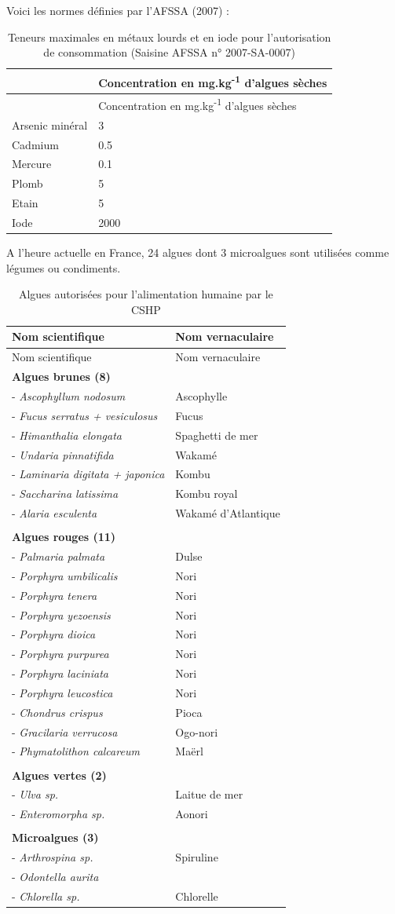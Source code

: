 \documentclass[
]{book}
\begin{document}
Voici les normes définies par l'AFSSA (2007) :

\begin{longtable}[]{@{}ll@{}}
\caption{Teneurs maximales en métaux lourds et en iode pour l'autorisation de consommation (Saisine AFSSA n° 2007-SA-0007)}\tabularnewline
\toprule
& Concentration en mg.kg\textsuperscript{-1} d'algues sèches\tabularnewline
\midrule
\endfirsthead
\toprule
& Concentration en mg.kg\textsuperscript{-1} d'algues sèches\tabularnewline
\midrule
\endhead
Arsenic minéral & 3\tabularnewline
Cadmium & 0.5\tabularnewline
Mercure & 0.1\tabularnewline
Plomb & 5\tabularnewline
Etain & 5\tabularnewline
Iode & 2000\tabularnewline
\bottomrule
\end{longtable}

A l'heure actuelle en France, 24 algues dont 3 microalgues sont utilisées comme légumes ou condiments.

\begin{longtable}[]{@{}ll@{}}
\caption{Algues autorisées pour l'alimentation humaine par le CSHP}\tabularnewline
\toprule
Nom scientifique & Nom vernaculaire\tabularnewline
\midrule
\endfirsthead
\toprule
Nom scientifique & Nom vernaculaire\tabularnewline
\midrule
\endhead
\textbf{Algues brunes (8)} &\tabularnewline
- \emph{Ascophyllum nodosum} & Ascophylle\tabularnewline
- \emph{Fucus serratus + vesiculosus} & Fucus\tabularnewline
- \emph{Himanthalia elongata} & Spaghetti de mer\tabularnewline
- \emph{Undaria pinnatifida} & Wakamé\tabularnewline
- \emph{Laminaria digitata + japonica} & Kombu\tabularnewline
- \emph{Saccharina latissima} & Kombu royal\tabularnewline
- \emph{Alaria esculenta} & Wakamé d'Atlantique\tabularnewline
&\tabularnewline
\textbf{Algues rouges (11)} &\tabularnewline
- \emph{Palmaria palmata} & Dulse\tabularnewline
- \emph{Porphyra umbilicalis} & Nori\tabularnewline
- \emph{Porphyra tenera} & Nori\tabularnewline
- \emph{Porphyra yezoensis} & Nori\tabularnewline
- \emph{Porphyra dioica} & Nori\tabularnewline
- \emph{Porphyra purpurea} & Nori\tabularnewline
- \emph{Porphyra laciniata} & Nori\tabularnewline
- \emph{Porphyra leucostica} & Nori\tabularnewline
- \emph{Chondrus crispus} & Pioca\tabularnewline
- \emph{Gracilaria verrucosa} & Ogo-nori\tabularnewline
- \emph{Phymatolithon calcareum} & Maërl\tabularnewline
&\tabularnewline
\textbf{Algues vertes (2)} &\tabularnewline
- \emph{Ulva sp.} & Laitue de mer\tabularnewline
- \emph{Enteromorpha sp.} & Aonori\tabularnewline
&\tabularnewline
\textbf{Microalgues (3)} &\tabularnewline
- \emph{Arthrospina sp.} & Spiruline\tabularnewline
- \emph{Odontella aurita} &\tabularnewline
- \emph{Chlorella sp.} & Chlorelle\tabularnewline
\bottomrule
\end{longtable}
\end{document}
